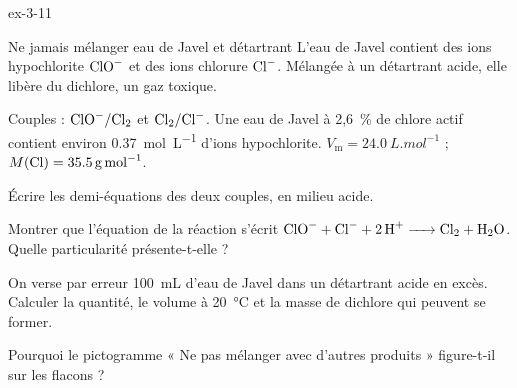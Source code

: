 \begin{blocLivre}{ex-3-11}
\begin{exercice}[2]{Ne jamais mélanger eau de Javel et détartrant}
L'eau de Javel contient des ions hypochlorite $\ce{ClO-}$ et des ions chlorure $\ce{Cl-}$. Mélangée à un détartrant acide, elle libère du
dichlore, un gaz toxique.
\begin{donnees}
Couples : $\ce{ClO-}/\ce{Cl2}$ et $\ce{Cl2}/\ce{Cl-}$. Une eau de Javel à 2,6~\% de chlore actif contient environ \qty{0,37}{mol.L^{-1}} d'ions hypochlorite.
$V_\mathrm{m}=\qty{24,0}{L.mol^{-1}}$ ; $M(\ce{Cl})=\qty{35,5}{g.mol^{-1}}$.
\end{donnees}
\begin{questions}
\item Écrire les demi-équations des deux couples, en milieu acide.
\item Montrer que l'équation de la réaction s'écrit $\ce{ClO- + Cl- + 2H+ -> Cl2 + H2O}$. Quelle particularité présente-t-elle ?
\item On verse par erreur \qty{100}{mL} d'eau de Javel dans un détartrant acide en excès. Calculer la quantité, le volume à \qty{20}{\degreeCelsius} et la
masse de dichlore qui peuvent se former.
\item Pourquoi le pictogramme « Ne pas mélanger avec d'autres produits » figure-t-il sur les flacons ?
\end{questions}
\end{exercice}
\end{blocLivre}
